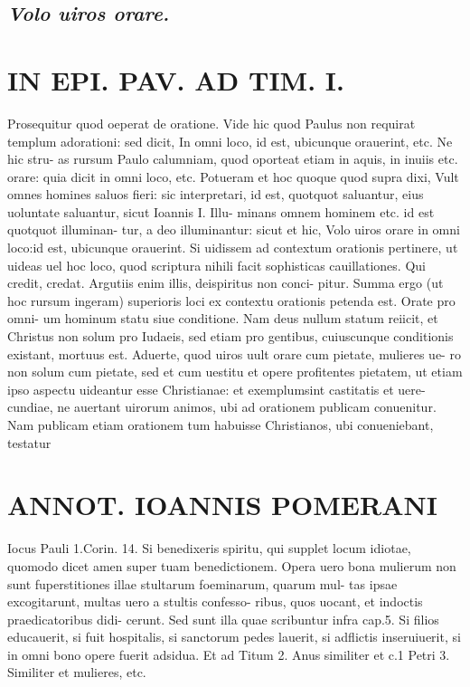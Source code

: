 \documentclass{article}
\begin{document}
\begin{pages}
\subsection*{\textit{Volo uiros orare. }}
\section*{IN EPI. PAV. AD TIM. I. }
\marginpar{[ p.85 ]}\pstart Prosequitur quod oeperat de oratione. Vide hic quod Paulus non requirat templum adorationi: sed dicit, In omni loco, id est, ubicunque  orauerint, etc. Ne hic stru- as rursum Paulo calumniam, quod oporteat etiam in aquis, in inuiis etc. orare: quia dicit in omni loco, etc. Potueram et hoc quoque  quod supra dixi, Vult omnes homines saluos fieri: sic interpretari, id est, quotquot saluantur, eius uoluntate saluantur, sicut Ioannis I. Illu- minans omnem hominem etc. id est quotquot illuminan- tur, a deo illuminantur: sicut et hic, Volo uiros orare in omni loco:id est, ubicunque  orauerint. Si uidissem ad contextum orationis pertinere, ut uideas uel hoc loco, quod scriptura nihili facit sophisticas cauillationes. Qui credit, credat. Argutiis enim illis, deispiritus non conci- pitur. Summa ergo (ut hoc rursum ingeram) superioris loci ex contextu orationis petenda est. Orate pro omni- um hominum statu siue conditione. Nam deus nullum statum reiicit, et Christus non solum pro Iudaeis, sed etiam pro gentibus, cuiuscunque  conditionis existant, mortuus est. Aduerte, quod uiros uult orare cum pietate, mulieres ue- ro non solum cum pietate, sed et cum uestitu et opere profitentes pietatem, ut etiam ipso aspectu uideantur esse Christianae: et exemplumsint castitatis et uere- cundiae, ne auertant uirorum animos, ubi ad orationem publicam conuenitur. Nam publicam etiam orationem tum habuisse Christianos, ubi conueniebant, testatur  \pend
\section*{ANNOT. IOANNIS POMERANI }\pstart Iocus Pauli 1.Corin. 14. Si benedixeris spiritu, qui supplet locum idiotae, quomodo dicet amen super tuam benedictionem. Opera uero bona mulierum non sunt fuperstitiones illae stultarum foeminarum, quarum mul- tas ipsae excogitarunt, multas uero a stultis confesso- ribus, quos uocant, et indoctis praedicatoribus didi- cerunt. Sed sunt illa quae scribuntur infra cap.5. Si filios educauerit, si fuit hospitalis, si sanctorum pedes lauerit, si adflictis inseruiuerit, si in omni bono opere fuerit adsidua. Et ad Titum 2. Anus similiter et c.1 Petri 3. Similiter et mulieres, etc.  \pend
{}
{}

\end{pages}
\end{document}
